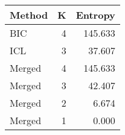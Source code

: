 \begin{center} 
\begin{tabular}{lrr}
 Method & K & Entropy \\ 
  \hline
\hline
BIC &    4 & 145.633 \\ 
  ICL &    3 & 37.607 \\ 
  Merged &    4 & 145.633 \\ 
  Merged &    3 & 42.407 \\ 
  Merged &    2 & 6.674 \\ 
  Merged &    1 & 0.000 \\ 
  \end{tabular}
\end{center} 
